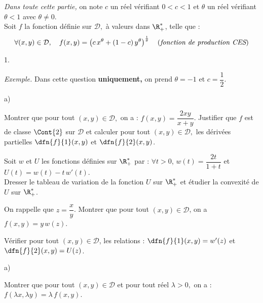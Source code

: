\documentclass[11pt]{article}%
\begin{document}
\noindent
{\it Dans toute cette partie,} on note $c$ un réel vérifiant $0<c<1$ et 
$\theta$ un réel vérifiant $\theta < 1$ avec $\theta \neq 0.$\\
Soit $f$ la fonction définie sur $\mathcal{D},$ à valeurs dans 
$\R_+^*$, telle que :
\[
\forall (x,y)\in \mathcal{D},\quad 
f(x,y)=\left(c \, x^\theta+(1-c) \, y^\theta\right)^{\frac{1}{\theta}} 
\quad \text{({\it fonction de production CES})}
\]
\begin{noliste}{1.}
 \setlength{\itemsep}{4mm}
 \item {\it Exemple.} Dans cette question \textbf{uniquement,} on prend 
 $\theta=-1$ et $c=\dfrac{1}{2}$.
 \begin{noliste}{a)}
  \setlength{\itemsep}{2mm}
  \item Montrer que pour tout $(x,y) \in \mathcal{D},$ on a : $f(x,y) = 
  \dfrac{2xy}{x+y}$. Justifier que $f$ est de classe $\Cont{2}$ sur 
  $\mathcal{D}$ et calculer pour tout $(x,y) \in \mathcal{D},$ les 
  dérivées partielles $\dfn{f}{1}(x,y)$ et $\dfn{f}{2}(x,y)$.
  
  
  
  
  
  
  
  
  

  
  \item Soit $w$ et $U$ les fonctions définies sur $\R_+^*$ par :
  $\forall t > 0$, $w(t)=\dfrac{2t}{1+t}$ et $U(t)=w(t)-t \, w'(t).$\\
  Dresser le tableau de variation de la fonction $U$ sur $\R_+^*$ et 
  étudier la convexité de $U$ sur $\R_+^*$.
  
  
  
  \item On rappelle que $z=\dfrac{x}{y}$. Montrer que pour tout $(x,y) 
  \in \mathcal{D}$, on a $f(x,y)=y \, w(z)$.
  
  

  
  \item Vérifier pour tout $(x,y) \in \mathcal{D}$, les relations : 
  $\dfn{f}{1}(x,y)=w'(z)$ et $\dfn{f}{2}(x,y)=U(z)$.
  
  
 \end{noliste}
 
 
 
 
 
 
 
 
 

 \item 
 \begin{noliste}{a)}
  \setlength{\itemsep}{2mm}
  \item Montrer que pour tout $(x,y) \in \mathcal{D}$ et pour tout réel 
  $\lambda >0,$ on a : $f(\lambda x,\lambda y)=\lambda \, f(x,y)$.
  

\end{noliste}
\end{noliste}
\end{document}
